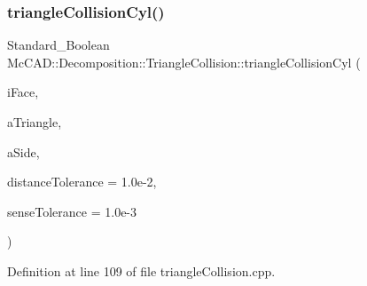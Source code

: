 \subsubsection{\texorpdfstring{triangle\+Collision\+Cyl()}{triangleCollisionCyl()}\hspace{0.1cm}{\footnotesize\ttfamily [2/2]}}
{\footnotesize\ttfamily Standard\+\_\+\+Boolean Mc\+C\+A\+D\+::\+Decomposition\+::\+Triangle\+Collision\+::triangle\+Collision\+Cyl (\begin{DoxyParamCaption}\item[{const \hyperlink{classMcCAD_1_1Geometry_1_1BoundSurface}{Mc\+C\+A\+D\+::\+Geometry\+::\+Bound\+Surface} \&}]{i\+Face,  }\item[{const \hyperlink{classMcCAD_1_1Geometry_1_1MeshTriangle}{Mc\+C\+A\+D\+::\+Geometry\+::\+Mesh\+Triangle} \&}]{a\+Triangle,  }\item[{Standard\+\_\+\+Integer \&}]{a\+Side,  }\item[{Standard\+\_\+\+Real}]{distance\+Tolerance = {\ttfamily 1.0e-\/2},  }\item[{Standard\+\_\+\+Real}]{sense\+Tolerance = {\ttfamily 1.0e-\/3} }\end{DoxyParamCaption})\hspace{0.3cm}{\ttfamily [private]}}



Definition at line 109 of file triangle\+Collision.\+cpp.


